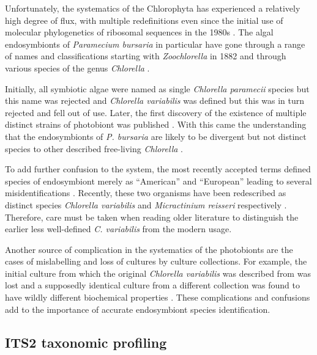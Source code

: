 
Unfortunately, the systematics of the Chlorophyta has experienced a relatively
high degree of flux, with multiple redefinitions even since the initial 
use of molecular phylogenetics of ribosomal sequences \citep{Hori1985,Gunderson1987}
in the 1980s \citep{Leliaert2012,Hoshina2010}.  The algal endosymbionts of
\textit{Paramecium bursaria} in particular have gone through a range of 
names and classifications starting with \textit{Zoochlorella} in 1882 and
through various species of the genus \textit{Chlorella} \citep{Hoshina2010}.

Initially, all symbiotic algae were named as single \textit{Chlorella paramecii}
species but this name was rejected and \textit{Chlorella variabilis} 
was defined \citep{shihira1965chlorella} but this was in turn rejected and fell out of use.
Later, the first discovery of the existence of multiple distinct strains of photobiont was published \citep{Douglas1986}.
With this came the understanding that the endosymbionts of \textit{P. bursaria}
are likely to be divergent but not distinct species to other described
free-living \textit{Chlorella} \citep{Hoshina2010}.

To add further confusion to the system, the most recently
accepted terms defined species of endosymbiont merely 
as ``American'' and ``European'' leading to several
misidentifications \citep{Kodama2007,Hoshina2010}.
Recently, these two organisms have been redescribed as
distinct species \textit{Chlorella variabilis} and
\textit{Micractinium reisseri} respectively \citep{Hoshina2010}.
Therefore, care must be taken when reading older literature
to distinguish the earlier less well-defined \textit{C. variabilis}
from the modern usage.

Another source of complication in the systematics of the photobionts 
are the cases of mislabelling and loss of cultures
by culture collections. For example, the initial culture from
which the original \textit{Chlorella variabilis} was described from was lost
and a supposedly identical culture from a different collection
was found to have wildly different biochemical properties \citep{Hoshina2010}.
These complications and confusions add to the importance
of accurate endosymbiont species identification. 

\subsection{ITS2 taxonomic profiling}

